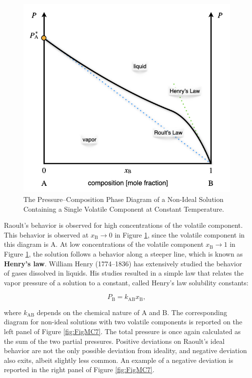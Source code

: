 \documentclass[
  9pt,
]{extbook}
\theoremstyle{definition}
\theoremstyle{definition}
\theoremstyle{definition}
\theoremstyle{definition}
\theoremstyle{remark}
\begin{document}
\begin{figure}

{\centering \includegraphics[width=0.6\linewidth]{./img/OEP_Figures.024} 

}

\caption{The Pressure–Composition Phase Diagram of a Non-Ideal Solution Containing a Single Volatile Component at Constant Temperature.}\label{fig:FigMC6}
\end{figure}

Raoult's behavior is observed for high concentrations of the volatile component. This behavior is observed at \(x_{\text{B}} \rightarrow 0\) in Figure \ref{fig:FigMC6}, since the volatile component in this diagram is \(\mathrm{A}\). At low concentrations of the volatile component \(x_{\text{B}} \rightarrow 1\) in Figure \ref{fig:FigMC6}, the solution follows a behavior along a steeper line, which is known as \textbf{Henry's law}. William Henry (1774--1836) has extensively studied the behavior of gases dissolved in liquids. His studies resulted in a simple law that relates the vapor pressure of a solution to a constant, called Henry's law solubility constants:

\begin{equation}
P_{\text{B}}=k_{\text{AB}} x_{\text{B}},
\label{eq:mc1b}
\end{equation}

where \(k_{\text{AB}}\) depends on the chemical nature of \(\mathrm{A}\) and \(\mathrm{B}\). The corresponding diagram for non-ideal solutions with two volatile components is reported on the left panel of Figure \ref{fig:FigMC7}. The total pressure is once again calculated as the sum of the two partial pressures. Positive deviations on Raoult's ideal behavior are not the only possible deviation from ideality, and negative deviation also exits, albeit slightly less common. An example of a negative deviation is reported in the right panel of Figure \ref{fig:FigMC7}.
\end{document}
